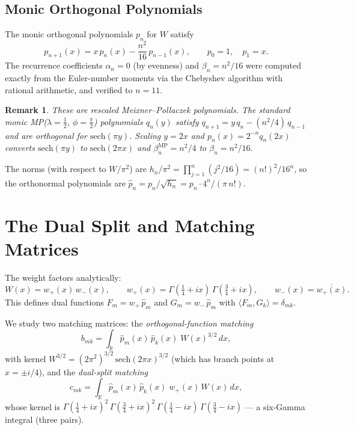 \documentclass[11pt,a4paper]{article}
\newtheorem{remark}[proposition]{Remark}
\newcommand{\R}{\mathbb{R}}
\begin{document}
\subsection{Monic Orthogonal Polynomials}

The monic orthogonal polynomials $p_n$ for $W$ satisfy
\begin{equation}\label{eq:rec}
  p_{n+1}(x) = x\, p_n(x) - \frac{n^2}{16}\, p_{n-1}(x),
  \qquad p_0 = 1, \quad p_1 = x.
\end{equation}
The recurrence coefficients $\alpha_n = 0$ (by evenness)
and $\beta_n = n^2/16$ were computed exactly from the
Euler-number moments via the Chebyshev algorithm with
rational arithmetic, and verified to $n = 11$.

\begin{remark}
These are rescaled Meixner--Pollaczek polynomials.
The standard monic MP($\lambda = \tfrac12$, $\phi = \tfrac\pi2$) polynomials
$q_n(y)$ satisfy $q_{n+1} = y\,q_n - (n^2/4)\,q_{n-1}$
and are orthogonal for $\mathrm{sech}(\pi y)$.
Scaling $y = 2x$ and $p_n(x) = 2^{-n} q_n(2x)$ converts
$\mathrm{sech}(\pi y)$ to $\mathrm{sech}(2\pi x)$
and $\beta_n^{\text{MP}} = n^2/4$ to $\beta_n = n^2/16$.
\end{remark}

The norms (with respect to $W/\pi^2$) are
$h_n/\pi^2 = \prod_{j=1}^n (j^2/16) = (n!)^2/16^n$,
so the orthonormal polynomials are
$\widehat{p}_n = p_n/\sqrt{h_n} = p_n \cdot 4^n/(\pi\, n!)$.

\section{The Dual Split and Matching Matrices}

The weight factors analytically:
\[
  W(x) = w_+(x)\, w_-(x), \qquad
  w_+(x) = \Gamma(\tfrac14+ix)\,\Gamma(\tfrac34+ix), \qquad
  w_-(x) = \overline{w_+(x)}.
\]
This defines dual functions $F_m = w_+\,\widehat{p}_m$
and $G_m = w_-\,\widehat{p}_m$ with
$\langle F_m, G_k \rangle = \delta_{mk}$.

We study two matching matrices: the \emph{orthogonal-function matching}
\[
  b_{mk} = \int_\R \widehat{p}_m(x)\,\widehat{p}_k(x)\; W(x)^{3/2}\, dx,
\]
with kernel $W^{3/2} = (2\pi^2)^{3/2}\,\mathrm{sech}(2\pi x)^{3/2}$
(which has branch points at $x = \pm i/4$), and the
\emph{dual-split matching}
\[
  c_{mk} = \int_\R \widehat{p}_m(x)\,\widehat{p}_k(x)\; w_+(x)\, W(x)\, dx,
\]
whose kernel is
$\Gamma(\tfrac14+ix)^2\,\Gamma(\tfrac34+ix)^2\,
\Gamma(\tfrac14-ix)\,\Gamma(\tfrac34-ix)$
--- a six-Gamma integral (three pairs).
\end{document}
